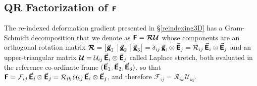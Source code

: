 \subsection{\textbf{QR} Factorization of $\boldsymbol{\mathsf{F}}$}
\label{secQR3D}

The re-indexed deformation gradient presented in \S\ref{reindexing3D} has a Gram-Schmidt decomposition that we denote as $\boldsymbol{\mathsf{F}} = \boldsymbol{\mathcal{RU}}$ whose components are an orthogonal rotation matrix $\boldsymbol{\mathcal{R}} = \bigl[ \vec{\boldsymbol{\mathsf{g}}}_1 \bigm| \vec{\boldsymbol{\mathsf{g}}}_2 \bigm| \vec{\boldsymbol{\mathsf{g}}}_3 \bigr] = \delta_{ij} \, \vec{\boldsymbol{\mathsf{g}}}_i \otimes \vec{\boldsymbol{\mathsf{E}}}_j = \mathcal{R}_{ij} \, \vec{\boldsymbol{\mathsf{E}}}_i \otimes \vec{\boldsymbol{\mathsf{E}}}_j$ and an upper-triangular matrix $\boldsymbol{\mathcal{U}} = \mathcal{U}_{ij} \, \vec{\boldsymbol{\mathsf{E}}}_i \otimes \vec{\boldsymbol{\mathsf{E}}}_j$ called Laplace stretch, \cite{Freedetal19} both evaluated in the reference co-ordinate frame $( \vec{\boldsymbol{\mathsf{E}}}_1 , \vec{\boldsymbol{\mathsf{E}}}_2 , \vec{\boldsymbol{\mathsf{E}}}_3 )$, so that $\boldsymbol{\mathsf{F}} = \mathcal{F}_{ij} \, \vec{\boldsymbol{\mathsf{E}}}_i \otimes \vec{\boldsymbol{\mathsf{E}}}_j = \mathcal{R}_{ik\,} \mathcal{U}_{kj} \, \vec{\boldsymbol{\mathsf{E}}}_i \otimes \vec{\boldsymbol{\mathsf{E}}}_j$, and therefore $\mathcal{F}_{ij} = \mathcal{R}_{ik\,} \mathcal{U}_{kj}$.

